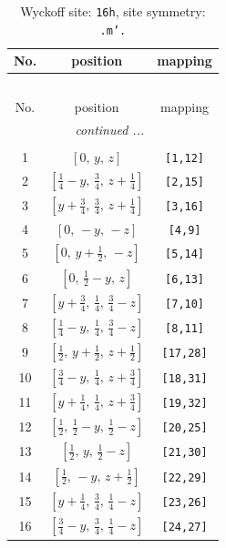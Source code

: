 \documentclass[fleqn,8pt]{jsarticle}
\begin{document}
\renewcommand{\arraystretch}{1.2}
\begin{longtable}{ccc}
\caption{Wyckoff site: {\tt 16h}, site symmetry: {\tt .m'.}}
 \\
 \hline \hline
No. & position & mapping \\ \hline \endfirsthead

\multicolumn{2}{l}{\tablename\ \thetable{}} \\
 \hline \hline
No. & position & mapping \\ \hline \endhead

 \hline \hline
\multicolumn{2}{r}{\footnotesize\it continued ...} \\ \endfoot

 \hline \hline
\multicolumn{2}{r}{} \\ \endlastfoot

1 & $\left[ 0,\, y,\, z \right]$ & {\tt [1,12]} \\ \hline
2 & $\left[ \frac{1}{4} - y,\, \frac{3}{4},\, z + \frac{1}{4} \right]$ & {\tt [2,15]} \\ \hline
3 & $\left[ y + \frac{3}{4},\, \frac{3}{4},\, z + \frac{1}{4} \right]$ & {\tt [3,16]} \\ \hline
4 & $\left[ 0,\, - y,\, - z \right]$ & {\tt [4,9]} \\ \hline
5 & $\left[ 0,\, y + \frac{1}{2},\, - z \right]$ & {\tt [5,14]} \\ \hline
6 & $\left[ 0,\, \frac{1}{2} - y,\, z \right]$ & {\tt [6,13]} \\ \hline
7 & $\left[ y + \frac{3}{4},\, \frac{1}{4},\, \frac{3}{4} - z \right]$ & {\tt [7,10]} \\ \hline
8 & $\left[ \frac{1}{4} - y,\, \frac{1}{4},\, \frac{3}{4} - z \right]$ & {\tt [8,11]} \\ \hline
9 & $\left[ \frac{1}{2},\, y + \frac{1}{2},\, z + \frac{1}{2} \right]$ & {\tt [17,28]} \\ \hline
10 & $\left[ \frac{3}{4} - y,\, \frac{1}{4},\, z + \frac{3}{4} \right]$ & {\tt [18,31]} \\ \hline
11 & $\left[ y + \frac{1}{4},\, \frac{1}{4},\, z + \frac{3}{4} \right]$ & {\tt [19,32]} \\ \hline
12 & $\left[ \frac{1}{2},\, \frac{1}{2} - y,\, \frac{1}{2} - z \right]$ & {\tt [20,25]} \\ \hline
13 & $\left[ \frac{1}{2},\, y,\, \frac{1}{2} - z \right]$ & {\tt [21,30]} \\ \hline
14 & $\left[ \frac{1}{2},\, - y,\, z + \frac{1}{2} \right]$ & {\tt [22,29]} \\ \hline
15 & $\left[ y + \frac{1}{4},\, \frac{3}{4},\, \frac{1}{4} - z \right]$ & {\tt [23,26]} \\ \hline
16 & $\left[ \frac{3}{4} - y,\, \frac{3}{4},\, \frac{1}{4} - z \right]$ & {\tt [24,27]} \\
\end{longtable}
\end{document}
